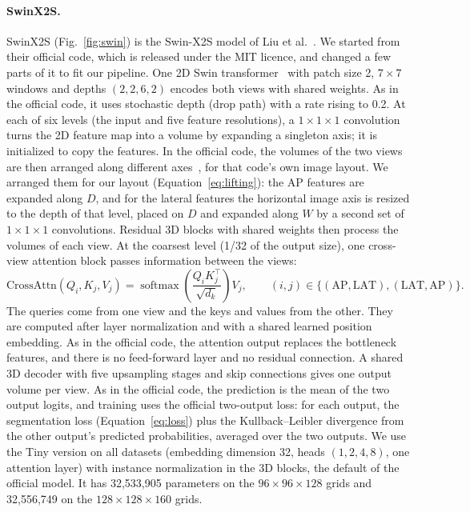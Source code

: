 \documentclass[11pt]{article}
\newcommand{\AP}{\mathrm{AP}}
\newcommand{\LAT}{\mathrm{LAT}}
\begin{document}
\paragraph{SwinX2S.}
SwinX2S (Fig.~\ref{fig:swin}) is the Swin-X2S model of Liu et al.~\cite{liuk2025}. We started from their official code, which is released under the MIT licence, and changed a few parts of it to fit our pipeline. One 2D Swin transformer~\cite{swin2021} with patch size 2, $7\times7$ windows and depths $(2,2,6,2)$ encodes both views with shared weights. As in the official code, it uses stochastic depth (drop path) with a rate rising to 0.2. At each of six levels (the input and five feature resolutions), a $1\times1\times1$ convolution turns the 2D feature map into a volume by expanding a singleton axis; it is initialized to copy the features. In the official code, the volumes of the two views are then arranged along different axes~\cite[Sec.~3.2]{liuk2025}, for that code's own image layout. We arranged them for our layout (Equation~\ref{eq:lifting}): the AP features are expanded along $D$, and for the lateral features the horizontal image axis is resized to the depth of that level, placed on $D$ and expanded along $W$ by a second set of $1\times1\times1$ convolutions. Residual 3D blocks with shared weights then process the volumes of each view. At the coarsest level (1/32 of the output size), one cross-view attention block passes information between the views:
\begin{equation}
\mathrm{CrossAttn}(Q_i,K_j,V_j)=\operatorname{softmax}\!\left(\frac{Q_iK_j^{\top}}{\sqrt{d_k}}\right)V_j,\qquad (i,j)\in\{(\AP,\LAT),(\LAT,\AP)\}.
\label{eq:attention}
\end{equation}
The queries come from one view and the keys and values from the other. They are computed after layer normalization and with a shared learned position embedding. As in the official code, the attention output replaces the bottleneck features, and there is no feed-forward layer and no residual connection. A shared 3D decoder with five upsampling stages and skip connections gives one output volume per view. As in the official code, the prediction is the mean of the two output logits, and training uses the official two-output loss: for each output, the segmentation loss (Equation~\ref{eq:loss}) plus the Kullback--Leibler divergence from the other output's predicted probabilities, averaged over the two outputs. We use the Tiny version on all datasets (embedding dimension 32, heads $(1,2,4,8)$, one attention layer) with instance normalization in the 3D blocks, the default of the official model. It has 32,533,905 parameters on the $96\times96\times128$ grids and 32,556,749 on the $128\times128\times160$ grids.
\end{document}
